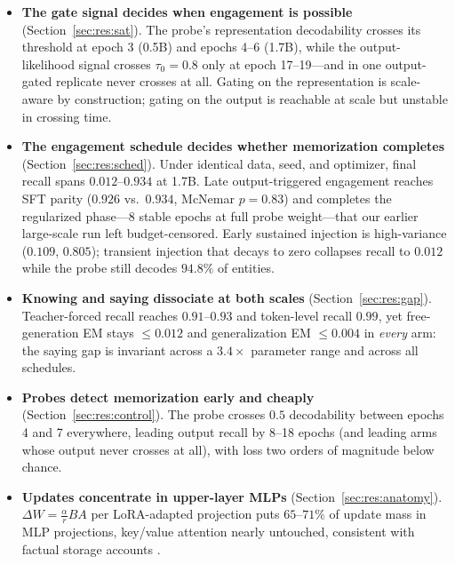 \begin{itemize}[leftmargin=1.4em,itemsep=1pt,topsep=2pt]
  \item \textbf{The gate signal decides when engagement is possible}
  (Section~\ref{sec:res:sat}). The probe's representation decodability
  crosses its threshold at epoch 3 (0.5B) and epochs 4--6 (1.7B), while
  the output-likelihood signal crosses $\tau_0{=}0.8$ only at epoch
  17--19---and in one output-gated replicate never crosses at all.
  Gating on the representation is scale-aware by construction; gating
  on the output is reachable at scale but unstable in crossing time.
  \item \textbf{The engagement schedule decides whether memorization
  completes} (Section~\ref{sec:res:sched}). Under identical data, seed,
  and optimizer, final recall spans $0.012$--$0.934$ at 1.7B. Late
  output-triggered engagement reaches SFT parity ($0.926$ vs.\ $0.934$,
  McNemar $p{=}0.83$) and completes the regularized phase---8 stable
  epochs at full probe weight---that our earlier large-scale run left
  budget-censored. Early sustained injection is high-variance
  ($0.109$, $0.805$); transient injection that decays to zero
  collapses recall to $0.012$ while the probe still decodes $94.8\%$
  of entities.
  \item \textbf{Knowing and saying dissociate at both scales}
  (Section~\ref{sec:res:gap}). Teacher-forced recall reaches
  $0.91$--$0.93$ and token-level recall $0.99$, yet free-generation EM
  stays $\le 0.012$ and generalization EM $\le 0.004$ in \emph{every}
  arm: the saying gap is invariant across a $3.4\times$ parameter
  range and across all schedules.
  \item \textbf{Probes detect memorization early and cheaply}
  (Section~\ref{sec:res:control}). The probe crosses $0.5$ decodability
  between epochs 4 and 7 everywhere, leading output recall by 8--18
  epochs (and leading arms whose output never crosses at all), with
  loss two orders of magnitude below chance.
  \item \textbf{Updates concentrate in upper-layer MLPs}
  (Section~\ref{sec:res:anatomy}). $\Delta W = \tfrac{\alpha}{r}BA$ per
  LoRA-adapted projection puts $65$--$71\%$ of update mass in MLP
  projections, key/value attention nearly untouched, consistent with
  factual storage accounts \citep{meng2022rome,geva2021ffn}.
\end{itemize}

